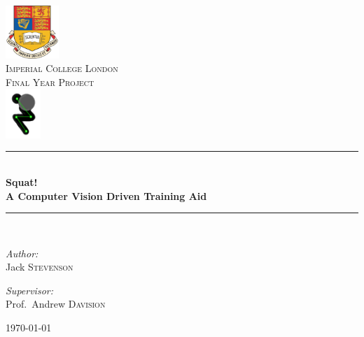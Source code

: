 \begin{titlepage}
\begin{center}

\includegraphics[width=0.15\textwidth]{title/images/ImperialCrest}~\\[1cm]

\textsc{\LARGE Imperial College London}\\[1.5cm]

\textsc{\Large Final Year Project}\\[0.5cm]

\includegraphics[width=0.10\textwidth]{title/images/squatslim}~\\

\noindent\rule{12cm}{0.6pt} \\
{ \huge \bfseries Squat! \\ A Computer Vision Driven Training Aid \\[0.4cm] }
\noindent\rule{12cm}{0.6pt} \\[1cm]

\begin{minipage}{0.4\textwidth}
\begin{flushleft} \large
\emph{Author:}\\
Jack \textsc{Stevenson}
\end{flushleft}
\end{minipage}
\begin{minipage}{0.4\textwidth}
\begin{flushright} \large
\emph{Supervisor:} \\
Prof.~Andrew \textsc{Davision}
\end{flushright}
\end{minipage}

\vfill

{\large \today}

\end{center}
\end{titlepage}